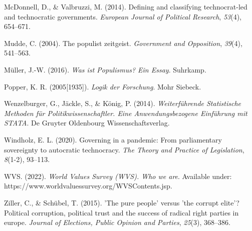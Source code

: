 \documentclass[
  12pt,
  english,
]{article}
\newlength{\cslhangindent}
\newlength{\cslentryspacingunit} %
\newenvironment{CSLReferences}[2] %
 {%
  \setlength{\parindent}{0pt}
  \ifodd #1
  \let\oldpar\par
  \def\par{\hangindent=\cslhangindent\oldpar}
  \fi
  \setlength{\parskip}{#2\cslentryspacingunit}
 }%
 {}
\begin{document}
\begin{CSLReferences}{1}{0}
\leavevmode{}%
McDonnell, D., \& Valbruzzi, M. (2014). Defining and classifying
technocrat-led and technocratic governments. \emph{European Journal of
Political Research}, \emph{53}(4), 654--671.

\leavevmode{}%
Mudde, C. (2004). The populist zeitgeist. \emph{Government and
Opposition}, \emph{39}(4), 541--563.

\leavevmode{}%
Müller, J.-W. (2016). \emph{{Was ist Populismus? Ein Essay}}. Suhrkamp.

\leavevmode{}%
Popper, K. R. (2005{[}1935{]}). \emph{{Logik der Forschung}}. Mohr
Siebeck.

\leavevmode{}%
Wenzelburger, G., Jäckle, S., \& König, P. (2014). \emph{{Weiterführende
Statistische Methoden für Politikwissenschaftler. Eine
Anwendungsbezogene Einführung mit STATA}}. De Gruyter Oldenbourg
Wissenschaftsverlag.

\leavevmode{}%
Windholz, E. L. (2020). Governing in a pandemic: From parliamentary
sovereignty to autocratic technocracy. \emph{The Theory and Practice of
Legislation}, \emph{8}(1-2), 93--113.

\leavevmode{}%
WVS. (2022). \emph{{World Values Survey (WVS)}. Who we are}. Available
under: https://www.worldvaluessurvey.org/WVSContents.jsp.

\leavevmode{}%
Ziller, C., \& Schübel, T. (2015). {'The pure people' versus 'the
corrupt elite'?} Political corruption, political trust and the success
of radical right parties in europe. \emph{Journal of Elections, Public
Opinion and Parties}, \emph{25}(3), 368--386.

\end{CSLReferences}
\end{document}
